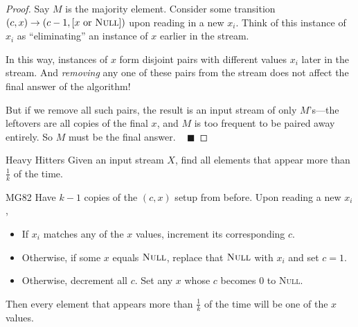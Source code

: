 \begin{proof}
    Say $M$ is the majority element.  Consider some transition $(c, x) \to (c - 1, [x \text{ or } \textsc{Null}])$ upon reading in a new $x_i$.  Think of this instance of $x_i$ as ``eliminating'' an instance of $x$ earlier in the stream.

    In this way, instances of $x$ form disjoint pairs with different values $x_i$ later in the stream.  And \emph{removing} any one of these pairs from the stream does not affect the final answer of the algorithm!

    But if we remove all such pairs, the result is an input stream of only $M$'s---the leftovers are all copies of the final $x$, and $M$ is too frequent to be paired away entirely.  So $M$ must be the final answer. ~ $\blacksquare$

    

\end{proof}

\begin{problem}{Heavy Hitters}
    Given an input stream $X$, find all elements that appear more than $\frac{1}{k}$ of the time.
\end{problem}

\begin{solution}{MG82}
    Have $k - 1$ copies of the $(c, x)$ setup from before.  Upon reading a new $x_i$,
    \begin{itemize}
        \item If $x_i$ matches any of the $x$ values, increment its corresponding $c$.
        \item Otherwise, if some $x$ equals $\textsc{Null}$, replace that $\textsc{Null}$ with $x_i$ and set $c = 1$.
        \item Otherwise, decrement all $c$.  Set any $x$ whose $c$ becomes $0$ to \textsc{Null}.
    \end{itemize}
    Then every element that appears more than $\frac{1}{k}$ of the time will be one of the $x$ values.
\end{solution}

